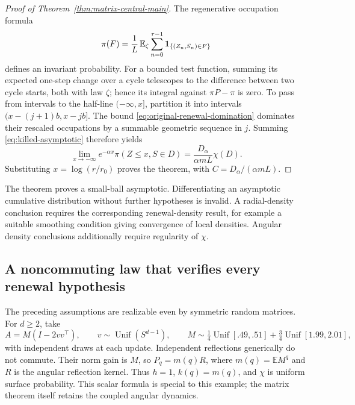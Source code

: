 \begin{proof}[Proof of Theorem~\ref{thm:matrix-central-main}]
The regenerative occupation formula
\begin{equation}
 \pi(F)=\frac{1}{L}\,
 \mathbb E_\zeta\sum_{n=0}^{\tau-1}{\bf1}_{\{(Z_n,S_n)\in F\}}
 \label{eq:regeneration-formula}
\end{equation}
defines an invariant probability. For a bounded test function, summing
its expected one-step change over a cycle telescopes to the difference
between two cycle starts, both with law $\zeta$; hence its integral
against $\pi P-\pi$ is zero.
To pass from intervals to the half-line $(-\infty,x]$, partition it
into intervals $(x-(j+1)b,x-jb]$. The bound
\eqref{eq:original-renewal-domination} dominates their rescaled
occupations by a summable geometric sequence in $j$. Summing
\eqref{eq:killed-asymptotic} therefore yields
\begin{equation}
 \lim_{x\to-\infty}e^{-\alpha x}\pi(Z\le x,S\in D)
 = \frac{D_\alpha}{\alpha m L}\chi(D).
 \label{eq:matrix-final-constant}
\end{equation}
Substituting $x=\log(r/r_0)$ proves the theorem, with
$C=D_\alpha/(\alpha mL)$.
\end{proof}

The theorem proves a small-ball asymptotic. Differentiating an
asymptotic cumulative distribution without further hypotheses is
invalid. A radial-density conclusion requires the corresponding
renewal-density result, for example a suitable smoothing condition
giving convergence of local densities. Angular density conclusions
additionally require regularity of $\chi$.

\subsection{A noncommuting law that verifies every renewal hypothesis}
\label{app:realizable-matrix-renewal}
The preceding assumptions are realizable even by symmetric random
matrices. For $d\ge2$, take
\begin{equation}
 A=M(I-2vv^\top),\qquad
 v\sim\operatorname{Unif}(S^{d-1}),\qquad
 M\sim\tfrac14\operatorname{Unif}[.49,.51]
      +\tfrac34\operatorname{Unif}[1.99,2.01],
 \label{eq:reflection-example}
\end{equation}
with independent draws at each update. Independent reflections
generically do not commute. Their norm gain is $M$, so
$P_q=m(q)R$, where $m(q)=\mathbb EM^q$ and $R$ is the angular
reflection kernel. Thus $h=1$, $k(q)=m(q)$, and $\chi$ is uniform
surface probability. This scalar formula is special to this example;
the matrix theorem itself retains the coupled angular dynamics.

